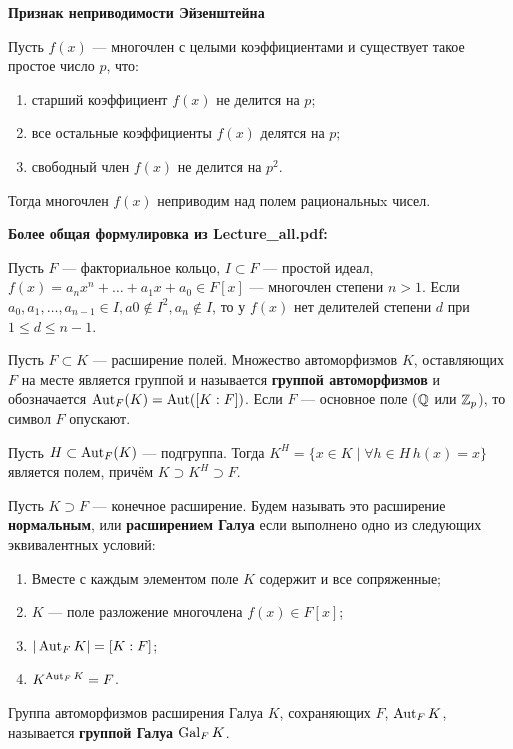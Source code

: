 \textbf{Признак неприводимости Эйзенштейна}

Пусть \(f(x)\) --- многочлен с целыми коэффициентами и существует такое простое число \(p\), что:

\begin{enumerate}
\def\labelenumi{\arabic{enumi}.}
\tightlist
\item
  старший коэффициент \(f(x)\) не делится на \(p\);
\item
  все остальные коэффициенты \(f(x)\) делятся на \(p\);
\item
  свободный член \(f(x)\) не делится на \(p^2\).
\end{enumerate}

Тогда многочлен \(f(x)\) неприводим над полем рациональныx чисел.

\textbf{Более общая формулировка из Lecture\_all.pdf:}

Пусть \(F\) --- факториальное кольцо, \(I \subset F\) --- простой идеал, \(f(x) = a_nx^n+\dots+a_1x + a_0 \in F [x]\) --- многочлен степени \(n > 1\).
Если \(a_0, a_1, \dots, a_{n-1} \in I, a0 \not\in I^2, a_n \not\in I\), то у \(f(x)\) нет делителей степени \(d\) при \(1 \le d\le n-1\).


Пусть \(F \subset K\) --- расширение полей. Множество автоморфизмов \(K\), оставляющих \(F\) на месте является группой и называется \textbf{группой автоморфизмов} и обозначается \(\operatorname{Aut}_F(K) = \operatorname{Aut}([K:F])\). Если \(F\) --- основное поле (\(\mathbb{Q}\) или \(\mathbb{Z}_p\)), то символ \(F\) опускают.

Пусть \(H \subset \operatorname{Aut}_F(K)\) --- подгруппа. Тогда \(K^{H} = \{x \in K \mid \forall h \in H \, h(x)=x\}\) является полем, причём \(K \supset K^H \supset F\).

Пусть \(K \supset F\) --- конечное расширение. Будем называть это расширение \textbf{нормальным}, или \textbf{расширением Галуа} если выполнено одно из следующих эквивалентных условий:

\begin{enumerate}
\def\labelenumi{(\arabic{enumi})}
\tightlist
\item
  Вместе с каждым элементом поле \(K\) содержит и все сопряженные;
\item
  \(K\) --- поле разложение многочлена \(f(x) \in F[x]\);
\item
  \(|\operatorname{Aut}_F{K}| = [K:F]\);
\item
  \(K^{\operatorname{Aut}_F{K}}=F\).
\end{enumerate}


Группа автоморфизмов расширения Галуа \(K\), сохраняющих \(F\), \(\operatorname{Aut}_FK\), называется \textbf{группой Галуа} \(\operatorname{Gal}_FK\).


